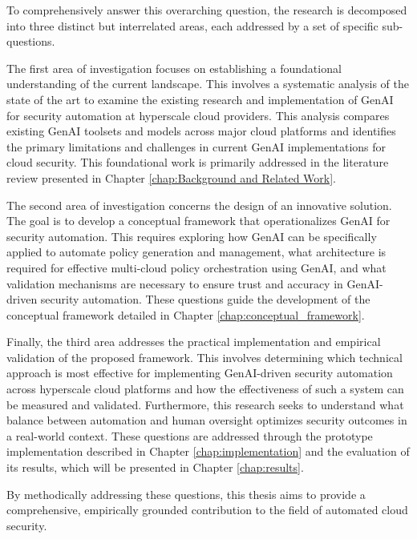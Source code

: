 To comprehensively answer this overarching question, the research is decomposed into three distinct but interrelated areas, each addressed by a set of specific sub-questions.

The first area of investigation focuses on establishing a foundational understanding of the current landscape. This involves a systematic analysis of the state of the art to examine the existing research and implementation of GenAI for security automation at hyperscale cloud providers. This analysis compares existing GenAI toolsets and models across major cloud platforms and identifies the primary limitations and challenges in current GenAI implementations for cloud security. This foundational work is primarily addressed in the literature review presented in Chapter \ref{chap:Background and Related Work}.

The second area of investigation concerns the design of an innovative solution. The goal is to develop a conceptual framework that operationalizes GenAI for security automation. This requires exploring how GenAI can be specifically applied to automate policy generation and management, what architecture is required for effective multi-cloud policy orchestration using GenAI, and what validation mechanisms are necessary to ensure trust and accuracy in GenAI-driven security automation. These questions guide the development of the conceptual framework detailed in Chapter \ref{chap:conceptual_framework}.

Finally, the third area addresses the practical implementation and empirical validation of the proposed framework. This involves determining which technical approach is most effective for implementing GenAI-driven security automation across hyperscale cloud platforms and how the effectiveness of such a system can be measured and validated. Furthermore, this research seeks to understand what balance between automation and human oversight optimizes security outcomes in a real-world context. These questions are addressed through the prototype implementation described in Chapter \ref{chap:implementation} and the evaluation of its results, which will be presented in Chapter \ref{chap:results}.

By methodically addressing these questions, this thesis aims to provide a comprehensive, empirically grounded contribution to the field of automated cloud security.

